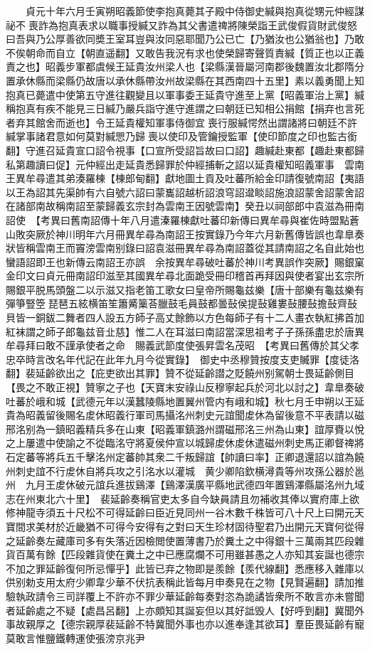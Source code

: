 　　貞元十年六月壬寅朔昭義節使李抱真薨其子殿中侍御史緘與抱真從甥元仲經謀祕不喪詐為抱真表求以職事授緘又詐為其父書遣禆將陳榮詣王武俊假貨財武俊怒曰吾與乃公厚善欲同奬王室耳豈與汝同惡耶聞乃公已亡【乃猶汝也公猶翁也】乃敢不俟朝命而自立【朝直遥翻】又敢告我況有求也使榮歸寄聲質責緘【質正也以正義責之也】昭義步軍都虞候王延貴汝州梁人也【梁縣漢晉屬河南郡後魏置汝北郡隋分置承休縣而梁縣仍故唐以承休縣帶汝州故梁縣在其西南四十五里】素以義勇聞上知抱真已薨遣中使第五守進往觀變且以軍事委王延貴守進至上黨【昭義軍治上黨】緘稱抱真有疾不能見三日緘乃嚴兵詣守進守進謂之曰朝廷已知相公捐館【捐弃也言死者弃其館舍而逝也】令王延貴權知軍事侍御宜喪行服緘愕然出謂諸將曰朝廷不許緘掌事諸君意如何莫對緘愳乃歸喪以使印及管鑰授監軍【使印節度之印也監古銜翻】守進召延貴宣口詔令視事【口宣所受詔旨故曰口詔】趣緘赴東都【趣赴東都歸私第趣讀曰促】元仲經出走延貴悉歸罪於仲經捕斬之詔以延貴權知昭義軍事　雲南王異牟尋遣其弟湊羅棟【棟郎甸翻】獻地圖土貢及吐蕃所給金印請復號南詔【夷語以王為詔其先渠帥有六自號六詔曰蒙巂詔越析詔浪穹詔邆睒詔施浪詔蒙舍詔蒙舍詔在諸部南故稱南詔至蒙歸義玄宗封為雲南王因號雲南】癸丑以祠部郎中袁滋為冊南詔使　【考異曰舊南詔傳十年八月遣溱羅棟獻吐蕃印新傳曰異牟尋與崔佐時盟點蒼山敗突厥於神川明年六月冊異牟尋為南詔王按實錄乃今年六月新舊傳皆誤也韋臯奏狀皆稱雲南王而竇滂雲南别錄曰詔袁滋冊異牟尋為南詔蓋從其請南詔之名自此始也蠻語詔即王也新傳云南詔王亦誤　余按異牟尋破吐蕃於神川考異誤作突厥】賜銀窠金印文曰貞元冊南詔印滋至其國異牟尋北面跪受冊印稽首再拜因與使者宴出玄宗所賜銀平脱馬頭盤二以示滋又指老笛工歌女曰皇帝所賜龜兹樂【唐十部樂有龜兹樂有彈箏豎箜琵琶五絃横笛笙簫觱篥荅臘鼓毛員鼓都曇鼔侯提鼔雞婁鼔腰鼔擔鼔齊鼔貝皆一銅鈸二舞者四人設五方師子高丈餘飾以方色每師子有十二人畫衣執紅拂首加紅袜謂之師子郎龜兹音㐀慈】惟二人在耳滋曰南詔當深思祖考子子孫孫盡忠於唐異牟尋拜曰敢不謹承使者之命　賜義武節度使張昇雲名茂昭　【考異曰舊傳於其父孝忠卒時言改名年代記在此年九月今從實錄】　御史中丞穆贊按度支吏贓罪【度徒洛翻】裴延齡欲出之【庇吏欲出其罪】贊不從延齡譛之貶饒州别駕朝士畏延齡側目【畏之不敢正視】贊寧之子也【天寶末安祿山反穆寧起兵於河北以討之】韋臯奏破吐蕃於峨和城【武德元年以漢蠶陵縣地置翼州管内有峨和城】秋七月壬申朔以王延貴為昭義留後賜名䖍休昭義行軍司馬攝洺州刺史元誼聞䖍休為留後意不平表請以磁邢洺别為一鎮昭義精兵多在山東【昭義軍鎮潞州謂磁邢洺三州為山東】誼厚賚以悅之上屢遣中使諭之不從臨洺守將夏侯仲宣以城歸䖍休䖍休遣磁州刺史馬正卿督禆將石定蕃等將兵五千擊洺州定蕃帥其衆二千叛歸誼【帥讀曰率】正卿退還詔以誼為饒州刺史誼不行䖍休自將兵攻之引洺水以灌城　黄少卿陷欽横潯貴等州攻孫公器於邕州　九月王䖍休破元誼兵進拔鷄澤【鷄澤漢廣平縣地武德四年置鷄澤縣屬洺州九域志在州東北六十里】　裴延齡奏稱官吏太多自今缺員請且勿補收其俸以實府庫上欲修神龍寺須五十尺松不可得延齡曰臣近見同州一谷木數千株皆可八十尺上曰開元天寶間求美材於近畿猶不可得今安得有之對曰天生珍材固待聖君乃出開元天寶何從得之延齡奏左藏庫司多有失落近因檢閲使置薄書乃於糞土之中得銀十三萬兩其匹段雜貨百萬有餘【匹段雜貨使在糞土之中已應腐爛不可用雖甚愚之人亦知其妄誕也德宗不加之罪延齡復何所忌憚乎】此皆已弃之物即是羨餘【羨代線翻】悉應移入雜庫以供别勅支用太府少卿韋少華不伏抗表稱此皆每月申奏見在之物【見賢遍翻】請加推驗執政請令三司詳覆上不許亦不罪少華延齡每奏對恣為詭譎皆衆所不敢言亦未嘗聞者延齡處之不疑【處昌呂翻】上亦頗知其誕妄但以其好詆毁人【好呼到翻】冀聞外事故親厚之【德宗親厚裴延齡不特冀聞外事也亦以進奉逢其欲耳】羣臣畏延齡有寵莫敢言惟鹽鐵轉運使張滂京兆尹
